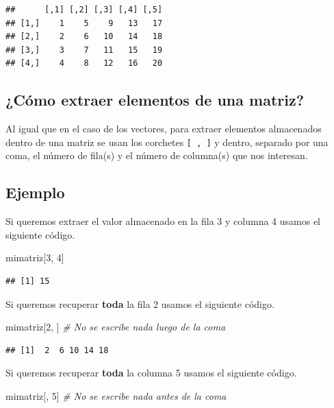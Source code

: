 \documentclass[10pt,]{krantz}
\makeatletter
\newenvironment{Shaded}{\begin{snugshade}}{\end{snugshade}}
\newcommand{\DecValTok}[1]{\textcolor[rgb]{0.00,0.00,0.81}{#1}}
\newcommand{\CommentTok}[1]{\textcolor[rgb]{0.56,0.35,0.01}{\textit{#1}}}
\newcommand{\NormalTok}[1]{#1}
\newenvironment{kframe}{%
\medskip{}
\setlength{\fboxsep}{.8em}
 \def\at@end@of@kframe{}%
 \ifinner\ifhmode%
  \def\at@end@of@kframe{\end{minipage}}%
  \begin{minipage}{\columnwidth}%
 \fi\fi%
 \def\FrameCommand##1{\hskip\@totalleftmargin \hskip-\fboxsep
 \colorbox{shadecolor}{##1}\hskip-\fboxsep
     \hskip-\linewidth \hskip-\@totalleftmargin \hskip\columnwidth}%
 \MakeFramed {\advance\hsize-\width
   \@totalleftmargin\z@ \linewidth\hsize
   \@setminipage}}%
 {\par\unskip\endMakeFramed%
 \at@end@of@kframe}
\renewenvironment{Shaded}{\begin{kframe}}{\end{kframe}}
\makeatother
\begin{document}
\begin{verbatim}
##      [,1] [,2] [,3] [,4] [,5]
## [1,]    1    5    9   13   17
## [2,]    2    6   10   14   18
## [3,]    3    7   11   15   19
## [4,]    4    8   12   16   20
\end{verbatim}

\subsection{¿Cómo extraer elementos de una
matriz?}\label{como-extraer-elementos-de-una-matriz}

Al igual que en el caso de los vectores, para extraer elementos
almacenados dentro de una matriz se usan los corchetes
\texttt{{[}\ ,\ {]}} y dentro, separado por una coma, el número de
fila(s) y el número de columna(s) que nos interesan.

\subsection*{Ejemplo}\label{ejemplo-1}


Si queremos extraer el valor almacenado en la fila 3 y columna 4 usamos
el siguiente código.

\begin{Shaded}
\begin{Highlighting}[]
\NormalTok{mimatriz[}\DecValTok{3}\NormalTok{, }\DecValTok{4}\NormalTok{]}
\end{Highlighting}
\end{Shaded}

\begin{verbatim}
## [1] 15
\end{verbatim}

Si queremos recuperar \textbf{toda} la fila 2 usamos el siguiente
código.

\begin{Shaded}
\begin{Highlighting}[]
\NormalTok{mimatriz[}\DecValTok{2}\NormalTok{, ]  }\CommentTok{# No se escribe nada luego de la coma}
\end{Highlighting}
\end{Shaded}

\begin{verbatim}
## [1]  2  6 10 14 18
\end{verbatim}

Si queremos recuperar \textbf{toda} la columna 5 usamos el siguiente
código.

\begin{Shaded}
\begin{Highlighting}[]
\NormalTok{mimatriz[, }\DecValTok{5}\NormalTok{]  }\CommentTok{# No se escribe nada antes de la coma}
\end{Highlighting}
\end{Shaded}
\end{document}
